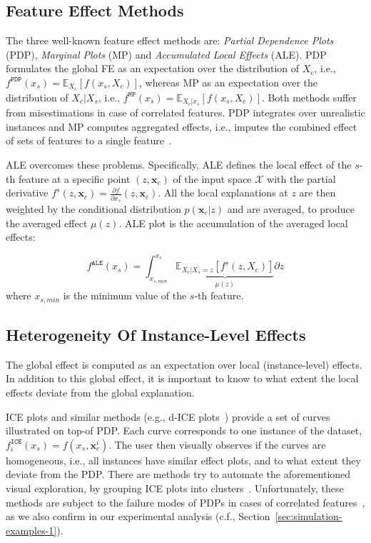 \documentclass[twoside]{article}
\newcommand{\xc}{\mathbf{x}_c}
\begin{document}
\subsection{Feature Effect Methods}
\label{sec:feat-effect-meth}
The three well-known feature effect methods are: \emph{Partial
  Dependence Plots} (PDP), \emph{Marginal Plots} (MP) and
\emph{Accumulated Local Effects} (ALE).  PDP formulates the global FE
as an expectation over the distribution of \(X_c\), i.e.,
\(f^{\mathtt{PDP}}(x_s) = \mathbb{E}_{X_c}[f(x_s,X_c)]\), whereas MP
as an expectation over the distribution of \(X_c|X_s\), i.e.,
\(f^{\mathtt{MP}}(x_s) = \mathbb{E}_{X_c|x_s}[f(x_s, X_c)]\). Both
methods suffer from misestimations in case of correlated features. PDP
integrates over unrealistic instances and MP computes aggregated
effects, i.e., imputes the combined effect of sets of features to a
single feature~\citep{apley2020visualizing}.

ALE overcomes these problems. Specifically, ALE defines the local
effect of the \(s\)-th feature at a specific point \((z, \xc)\) of the
input space \(\mathcal{X}\) with the partial derivative
\(f^s(z, \xc) = \frac{\partial f}{\partial x_s} (z, \xc)\). All the
local explanations at \(z\) are then weighted by the conditional
distribution \(p(\xc|z)\) and are averaged, to produce the averaged
effect \(\mu(z)\). ALE plot is the accumulation of the averaged local
effects:

\begin{equation}
  \label{eq:ALE}
  f^{\mathtt{ALE}}(x_s) = \int_{x_{s,min}}^{x_s} \underbrace{\mathbb{E}_{X_c|X_s=z}\left [f^s (z, X_c)\right ]}_{\mu(z)} \partial z
\end{equation}
%
where \(x_{s,min}\) is the minimum value of the \(s\)-th feature.

\subsection{Heterogeneity Of Instance-Level Effects}
\label{sec:quant-heter-effects}

The global effect is computed as an expectation over local
(instance-level) effects. In addition to this global effect, it is
important to know to what extent the local effects deviate from the
global explanation. 

ICE plots and similar methods (e.g., d-ICE
plots~\citep{goldstein2015peeking}) provide a set of curves
illustrated on top-of PDP. Each curve corresponds to one instance of
the dataset, \(f^{\mathtt{ICE}}_i(x_s) = f(x_s, \xc^i)\). The user
then visually observes if the curves are homogeneous, i.e., all
instances have similar effect plots, and to what extent they deviate
from the PDP. There are methods try to automate the aforementioned
visual exploration, by grouping ICE plots into
clusters~\citep{molnar2020model, herbinger2022repid,
  britton2019vine}. Unfortunately, these methods are subject to the
failure modes of PDPs in cases of correlated
features~\citep{baniecki2021fooling}, as we also confirm in our
experimental analysis (c.f., Section~\ref{sec:simulation-examples-1}).
\end{document}
